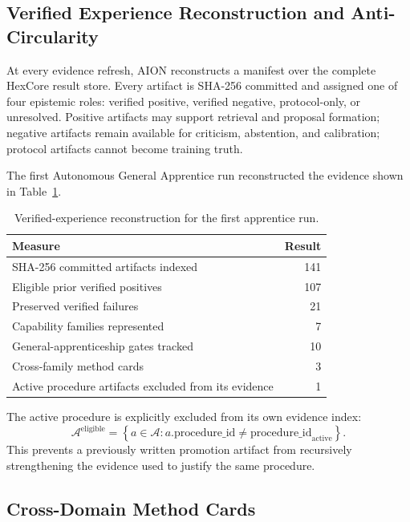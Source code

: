 \subsection{Verified Experience Reconstruction and Anti-Circularity}
\label{subsec:apprentice-experience-index}

At every evidence refresh, AION reconstructs a manifest over the complete
HexCore result store.  Every artifact is SHA-256 committed and assigned one of
four epistemic roles: verified positive, verified negative, protocol-only, or
unresolved.  Positive artifacts may support retrieval and proposal formation;
negative artifacts remain available for criticism, abstention, and
calibration; protocol artifacts cannot become training truth.

The first Autonomous General Apprentice run reconstructed the evidence shown in
Table~\ref{tab:general-apprentice-corpus}.

\begin{table}[htbp]
\centering
\caption{Verified-experience reconstruction for the first apprentice run.}
\label{tab:general-apprentice-corpus}
\begin{tabular}{@{}lr@{}}
\toprule
Measure & Result \\
\midrule
SHA-256 committed artifacts indexed & 141 \\
Eligible prior verified positives & 107 \\
Preserved verified failures & 21 \\
Capability families represented & 7 \\
General-apprenticeship gates tracked & 10 \\
Cross-family method cards & 3 \\
Active procedure artifacts excluded from its evidence & 1 \\
\bottomrule
\end{tabular}
\end{table}

The active procedure is explicitly excluded from its own evidence index:
\begin{equation}
\mathcal{A}^{\mathrm{eligible}}
=\left\{a\in\mathcal{A}:a.\mathrm{procedure\_id}
\neq \mathrm{procedure\_id}_{\mathrm{active}}\right\}.
\label{eq:self-evidence-exclusion}
\end{equation}
This prevents a previously written promotion artifact from recursively
strengthening the evidence used to justify the same procedure.

\subsection{Cross-Domain Method Cards}
\label{subsec:apprentice-method-cards}

